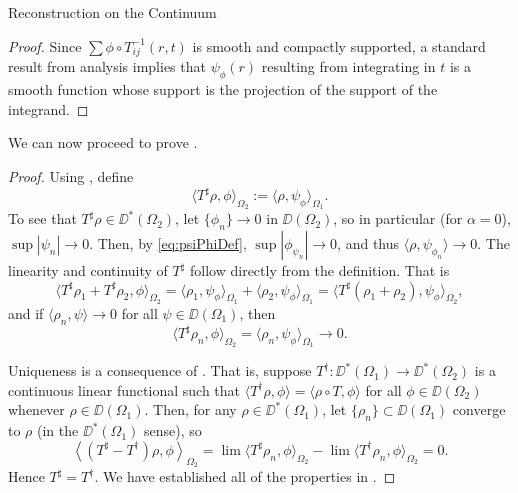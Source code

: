 \begin{chapter}{Reconstruction on the Continuum}
\begin{proof}
  Since $\sum \phi\circ T_{ij}^{-1}(r,t)$ is smooth and compactly supported, a standard result from analysis \cite[pg. 433]{strichartz2000} implies that $\psi_\phi(r)$ resulting from integrating in $t$ is a smooth function whose support is the projection of the support of the integrand.
\end{proof}

We can now proceed to prove .
\begin{proof}
  Using , define
  \begin{equation}
    \langle T^\sharp \rho, \phi \rangle_{\Omega_2} := \langle \rho, \psi_\phi\rangle_{\Omega_1}.
  \end{equation}
  To see that $T^\sharp \rho \in \DD^*(\Omega_2)$, let $\{\phi_n\} \to 0$ in $\DD(\Omega_2)$, so in particular (for $\alpha = 0$), $\sup|\psi_n| \to 0$. 
  Then, by \eqref{eq:psiPhiDef}, $\sup |\phi_{\psi_n}| \to 0$, and thus $\langle \rho, \psi_{\phi_n}\rangle \to 0$. 
  The linearity and continuity of $T^\sharp$ follow directly from the definition.
  That is 
  \begin{equation}
    \langle T^\sharp \rho_1 + T^\sharp \rho_2,\phi\rangle_{\Omega_2} = \langle \rho_1,\psi_\phi\rangle_{\Omega_1} + \langle \rho_2 ,\psi_\phi \rangle_{\Omega_1} = \langle T^\sharp(\rho_1+\rho_2),\psi_\phi\rangle_{\Omega_2}, 
  \end{equation} 
  and if $\langle \rho_n, \psi\rangle \to 0$ for all $\psi \in \DD(\Omega_1)$, then 
  \begin{equation}
    \langle T^\sharp \rho_n,\phi\rangle_{\Omega_2} = \langle \rho_n,\psi_\phi\rangle_{\Omega_1} \to 0.
  \end{equation}

  Uniqueness is a consequence of . That is, suppose $T^\dagger:\DD^*(\Omega_1) \to \DD^*(\Omega_2)$ is a continuous linear functional such that $\langle T^\dagger \rho,\phi \rangle = \langle \rho \circ T, \phi\rangle$ for all $\phi \in \DD(\Omega_2)$ whenever $\rho \in \DD(\Omega_1)$. Then, for any $\rho \in \DD^*(\Omega_1)$, let $\{\rho_n\}\subset \DD(\Omega_1)$ converge to $\rho$ (in the $\DD^*(\Omega_1)$ sense), so 
  \begin{equation}
    \left\langle (T^\sharp - T^\dagger)\rho,\phi\right\rangle_{\Omega_2} = \lim \langle T^\sharp\rho_n,\phi\rangle_{\Omega_2} - \lim \langle T^\dagger\rho_n,\phi\rangle_{\Omega_2} = 0.
  \end{equation}
  Hence $T^\sharp = T^\dagger$.
  We have established all of the properties in .
\end{proof}


\end{chapter}
